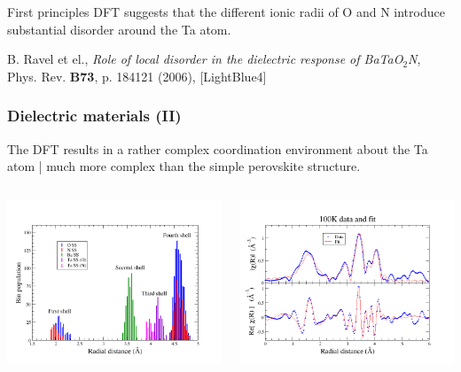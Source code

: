\begin{frame}
  First principles DFT suggests that the different ionic radii of O
  and N introduce substantial disorder around the Ta atom.
  
  \begin{bottomnote}[0.5][19]
    B. Ravel et el., \textit{Role of local disorder in the dielectric
      response of BaTaO$_2$N}, Phys. Rev. \textbf{B73}, p. 184121 (2006),
    [LightBlue4]
  \end{bottomnote}
\end{frame}

\begin{frame}
  \frametitle{Dielectric materials (II)}%
  The DFT results in a rather complex coordination environment about
  the Ta atom | much more complex than the simple perovskite
  structure.
  \begin{columns}
    \begin{column}{0.5\linewidth}
      \begin{center}
        \includegraphics[width=\linewidth]{xas/bton_SS.png}
      \end{center}
    \end{column}
    \begin{column}{0.5\linewidth}
      \begin{center}
        \includegraphics[width=\linewidth]{xas/bton_fit.png}

\end{center}
\end{column}
\end{columns}
\end{frame}
